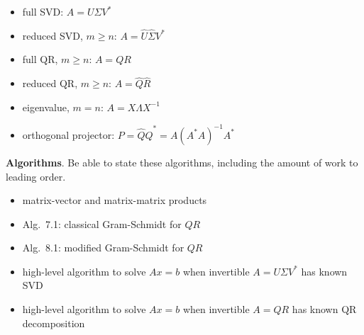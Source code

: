 \documentclass[11pt]{amsart}
\newcommand{\bigspacing}{\renewcommand{\baselinestretch}{1.21}\tiny\normalsize}
\begin{document}
\bigspacing

\begin{itemize}
\item full SVD: $A=U \Sigma V^*$
\item reduced SVD, $m\ge n$: $A=\hat U \hat \Sigma V^*$
\item full QR, $m\ge n$: $A=QR$
\item reduced QR, $m\ge n$: $A=\hat Q \hat R$
\item eigenvalue, $m=n$: $A = X\Lambda X^{-1}$
\item orthogonal projector: $P=\hat Q\hat Q^* = A\left(A^* A\right)^{-1} A^*$
\end{itemize}

\medskip\noindent \textbf{Algorithms}. Be able to state these algorithms, including the amount of work to leading order.
\begin{itemize}
\item matrix-vector and matrix-matrix products
\item Alg.~7.1: classical Gram-Schmidt for $QR$
\item Alg.~8.1: modified Gram-Schmidt for $QR$
\item high-level algorithm to solve $Ax=b$ when invertible $A=U\Sigma V^*$ has known SVD
\item high-level algorithm to solve $Ax=b$ when invertible $A=QR$ has known QR decomposition
\end{itemize}
\end{document}
